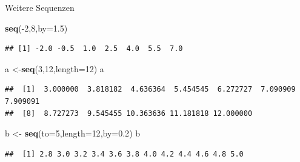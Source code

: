 \documentclass[ignorenonframetext,]{beamer}
\newenvironment{Shaded}{}{}
\newcommand{\KeywordTok}[1]{\textcolor[rgb]{0.00,0.44,0.13}{\textbf{{#1}}}}
\newcommand{\DataTypeTok}[1]{\textcolor[rgb]{0.56,0.13,0.00}{{#1}}}
\newcommand{\DecValTok}[1]{\textcolor[rgb]{0.25,0.63,0.44}{{#1}}}
\newcommand{\FloatTok}[1]{\textcolor[rgb]{0.25,0.63,0.44}{{#1}}}
\newcommand{\StringTok}[1]{\textcolor[rgb]{0.25,0.44,0.63}{{#1}}}
\newcommand{\NormalTok}[1]{{#1}}
\begin{document}
\begin{frame}[fragile]{Weitere Sequenzen}

\begin{Shaded}
\begin{Highlighting}[]
\KeywordTok{seq}\NormalTok{(-}\DecValTok{2}\NormalTok{,}\DecValTok{8}\NormalTok{,}\DataTypeTok{by=}\FloatTok{1.5}\NormalTok{)}
\end{Highlighting}
\end{Shaded}

\begin{verbatim}
## [1] -2.0 -0.5  1.0  2.5  4.0  5.5  7.0
\end{verbatim}

\begin{Shaded}
\begin{Highlighting}[]
\NormalTok{a <-}\KeywordTok{seq}\NormalTok{(}\DecValTok{3}\NormalTok{,}\DecValTok{12}\NormalTok{,}\DataTypeTok{length=}\DecValTok{12}\NormalTok{)}
\NormalTok{a}
\end{Highlighting}
\end{Shaded}

\begin{verbatim}
##  [1]  3.000000  3.818182  4.636364  5.454545  6.272727  7.090909  7.909091
##  [8]  8.727273  9.545455 10.363636 11.181818 12.000000
\end{verbatim}

\begin{Shaded}
\begin{Highlighting}[]
\NormalTok{b <-}\StringTok{ }\KeywordTok{seq}\NormalTok{(}\DataTypeTok{to=}\DecValTok{5}\NormalTok{,}\DataTypeTok{length=}\DecValTok{12}\NormalTok{,}\DataTypeTok{by=}\FloatTok{0.2}\NormalTok{)}
\NormalTok{b}
\end{Highlighting}
\end{Shaded}

\begin{verbatim}
##  [1] 2.8 3.0 3.2 3.4 3.6 3.8 4.0 4.2 4.4 4.6 4.8 5.0
\end{verbatim}

\end{frame}
\end{document}
